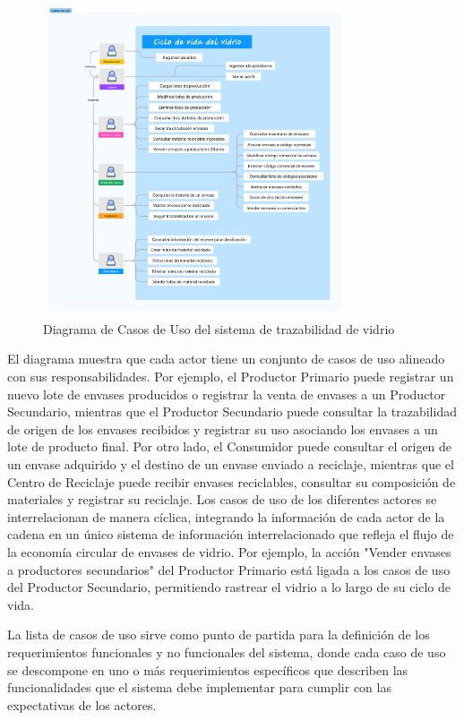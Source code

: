 \begin{figure}[!htpb]
    \centering
    \includegraphics[width=0.8\textwidth]{Figures/use-case-diagram.png}
    \caption{Diagrama de Casos de Uso del sistema de trazabilidad de vidrio}
    \label{fig:use-case-diagram}
\end{figure}

El diagrama muestra que cada actor tiene un conjunto de casos de uso alineado con sus responsabilidades. Por ejemplo, el Productor Primario puede registrar un nuevo lote de envases producidos o registrar la venta de envases a un Productor Secundario, mientras que el Productor Secundario puede consultar la trazabilidad de origen de los envases recibidos y registrar su uso asociando los envases a un lote de producto final. Por otro lado, el Consumidor puede consultar el origen de un envase adquirido y el destino de un envase enviado a reciclaje, mientras que el Centro de Reciclaje puede recibir envases reciclables, consultar su composición de materiales y registrar su reciclaje. Los casos de uso de los diferentes actores se interrelacionan de manera cíclica, integrando la información de cada actor de la cadena en un único sistema de información interrelacionado que refleja el flujo de la economía circular de envases de vidrio. Por ejemplo, la acción "Vender envases a productores secundarios" del Productor Primario está ligada a los casos de uso del Productor Secundario, permitiendo rastrear el vidrio a lo largo de su ciclo de vida.

La lista de casos de uso sirve como punto de partida para la definición de los requerimientos funcionales y no funcionales del sistema, donde cada caso de uso se descompone en uno o más requerimientos específicos que describen las funcionalidades que el sistema debe implementar para cumplir con las expectativas de los actores.

